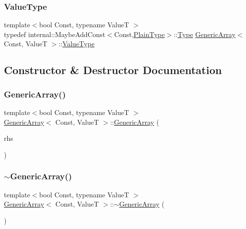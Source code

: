 \subsubsection{\texorpdfstring{Value\+Type}{ValueType}}
{\footnotesize\ttfamily template$<$bool Const, typename ValueT $>$ \\
typedef internal\+::\+Maybe\+Add\+Const$<$Const,\hyperlink{classGenericArray_aecea8be3dca6799bc523f4bffd221839}{Plain\+Type}$>$\+::\hyperlink{rapidjson_8h_a1d1cfd8ffb84e947f82999c682b666a7}{Type} \hyperlink{classGenericArray}{Generic\+Array}$<$ Const, ValueT $>$\+::\hyperlink{classGenericArray_a93e53f38a99fc5167eb2a28653de64ed}{Value\+Type}}



\subsection{Constructor \& Destructor Documentation}
\mbox{\label{classGenericArray_aa589d897a194b349d5053391a6f1491d}} 
\subsubsection{\texorpdfstring{Generic\+Array()}{GenericArray()}\hspace{0.1cm}{\footnotesize\ttfamily [1/3]}}
{\footnotesize\ttfamily template$<$bool Const, typename ValueT $>$ \\
\hyperlink{classGenericArray}{Generic\+Array}$<$ Const, ValueT $>$\+::\hyperlink{classGenericArray}{Generic\+Array} (\begin{DoxyParamCaption}\item[{\hyperlink{classGenericArray_a25d2ed55daa117c41db6a5b3f87e9ddc}{const} \hyperlink{classGenericArray}{Generic\+Array}$<$ Const, ValueT $>$ \&}]{rhs }\end{DoxyParamCaption})\hspace{0.3cm}{\ttfamily [inline]}}

\mbox{\label{classGenericArray_a9c6b8f44efa60f720155f968b662e99e}} 
\subsubsection{\texorpdfstring{$\sim$\+Generic\+Array()}{~GenericArray()}}
{\footnotesize\ttfamily template$<$bool Const, typename ValueT $>$ \\
\hyperlink{classGenericArray}{Generic\+Array}$<$ Const, ValueT $>$\+::$\sim$\hyperlink{classGenericArray}{Generic\+Array} (\begin{DoxyParamCaption}{ }\end{DoxyParamCaption})\hspace{0.3cm}{\ttfamily [inline]}}

